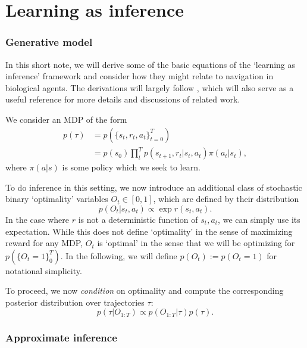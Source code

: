 \section{Learning as inference}

\subsubsection*{Generative model}

In this short note, we will derive some of the basic equations of the `learning as inference' framework and consider how they might relate to navigation in biological agents.
The derivations will largely follow \citep{levine2018reinforcement}, which will also serve as a useful reference for more details and discussions of related work.

We consider an MDP of the form
\begin{align}
    p(\tau ) & = p(\{ s_t, r_t, a_t \}_{t = 0}^T )                           \\
             & = p(s_0) \prod_t^T p(s_{t+1}, r_t | s_t, a_t) \pi(a_t | s_t),
\end{align}
where $\pi(a|s)$ is some policy which we seek to learn.

To do inference in this setting, we now introduce an additional class of stochastic binary `optimality' variables \citep{levine2018reinforcement} $O_t \in [0, 1]$, which are defined by their distribution
\begin{equation}
    p(O_t | s_t, a_t) \propto \exp r(s_t, a_t).
\end{equation}
In the case where $r$ is not a deterministic function of $s_t, a_t$, we can simply use its expectation.
While this does not define `optimality' in the sense of maximizing reward for any MDP, $O_t$ is `optimal' in the sense that we will be optimizing for $p(\{ O_t = 1 \}_0^T)$.
In the following, we will define $p(O_t) := p(O_t = 1)$ for notational simplicity.

To proceed, we now \emph{condition} on optimality and compute the corresponding posterior distribution over trajectories $\tau$:
\begin{equation}
    p(\tau | O_{1:T}) \propto p(O_{1:T} | \tau) p(\tau).
\end{equation}

\subsubsection*{Approximate inference}


